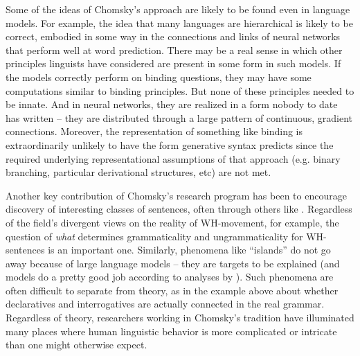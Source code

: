 \documentclass[output=paper,colorlinks,citecolor=brown
]{langscibook}
\begin{document}
Some of the ideas of Chomsky's approach are likely to be found even in language models. For example, the idea that many languages are hierarchical is likely to be correct, embodied in some way in the connections and links of neural networks that perform well at word prediction.  There may be a real sense in which other principles linguists have considered are present in some form in such models. If the models correctly perform on binding questions, they may have some computations similar to binding principles. But none of these principles needed to be innate. And in neural networks, they are realized in a form nobody to date has written -- they are distributed through a large pattern of continuous, gradient connections. Moreover, the representation of something like binding is extraordinarily unlikely to have the form generative syntax predicts since the required underlying representational assumptions of that approach (e.g. binary branching, particular derivational structures, etc) are not met. 


Another key contribution of Chomsky's research program has been to encourage discovery of interesting classes of sentences, often through others like \citet{ross1967constraints}. Regardless of the field's divergent views on the reality of WH-movement, for example, the question of \textit{what} determines grammaticality and ungrammaticality for WH-sentences is an important one. Similarly,  phenomena like ``islands'' do not go away because of large language models -- they are targets to be explained (and models do a pretty good job according to analyses by \citealt{wilcox2022using}). Such phenomena are often difficult to separate from theory, as in the example above about whether declaratives and interrogatives are actually connected in the real grammar. Regardless of theory, researchers working in Chomsky's tradition have illuminated many places where human linguistic behavior is more complicated or intricate than one might otherwise expect.
\end{document}

